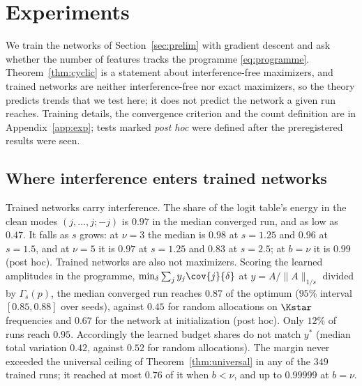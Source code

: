 \section{Experiments}\label{sec:experiments}

We train the networks of Section~\ref{sec:prelim} with gradient descent and ask whether the number of features tracks the programme \eqref{eq:programme}. Theorem~\ref{thm:cyclic} is a statement about interference-free maximizers, and trained networks are neither interference-free nor exact maximizers, so the theory predicts trends that we test here; it does not predict the network a given run reaches. Training details, the convergence criterion and the count definition are in Appendix~\ref{app:exp}; tests marked \emph{post hoc} were defined after the preregistered results were seen.

\subsection{Where interference enters trained networks}

Trained networks carry interference. The share of the logit table's energy in the clean modes $(j,\dots,j;-j)$ is $0.97$ in the median converged run, and as low as $0.47$. It falls as $s$ grows: at $\nu=3$ the median is $0.98$ at $s=1.25$ and $0.96$ at $s=1.5$, and at $\nu=5$ it is $0.97$ at $s=1.25$ and $0.83$ at $s=2.5$; at $b=\nu$ it is $0.99$ (post hoc). Trained networks are also not maximizers. Scoring the learned amplitudes in the programme, $\min_\delta\sum_jy_j\cov{j}{\delta}$ at $y=A/\|A\|_{1/s}$ divided by $\Gamma_s(p)$, the median converged run reaches $0.87$ of the optimum ($95\%$ interval $[0.85,0.88]$ over seeds), against $0.45$ for random allocations on $\Kstar$ frequencies and $0.67$ for the network at initialization (post hoc). Only $12\%$ of runs reach $0.95$. Accordingly the learned budget shares do not match $y^*$ (median total variation $0.42$, against $0.52$ for random allocations). The margin never exceeded the universal ceiling of Theorem~\ref{thm:universal} in any of the $349$ trained runs; it reached at most $0.76$ of it when $b<\nu$, and up to $0.99999$ at $b=\nu$.

